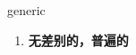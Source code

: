 
\begin{frame}
{\huge generic}
\begin{center}
\begin{enumerate}\Large
  \item \textbf{无差别的，普遍的}
\end{enumerate}
\end{center}
\end{frame}

